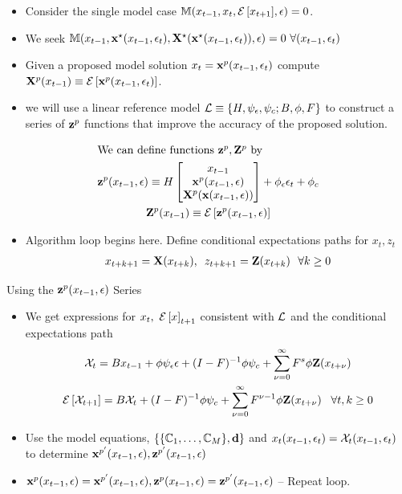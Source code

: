 \documentclass[12pt]{article}
\begin{document}
{
  \begin{itemize}
  \item Consider the single model case $  \mathbb{M}(x_{t-1},x_t,{\mathcal{E}\left [ x_{t+1} \right ]},\epsilon)=0$.  
\item We seek $\mathbb{M}(x_{t-1},\mathbf{x}^\star(x_{t-1},\epsilon_t),\mathbf{X}^\star(\mathbf{x}^\star(x_{t-1},\epsilon_t)),\epsilon)=0\,\,\forall (x_{t-1},\epsilon_t) $
\item Given a proposed model solution $x_t=\mathbf{x}^p(x_{t-1},\epsilon_t)$ compute $\mathbf{X}^p(x_{t-1})\equiv {\mathcal{E}\left [  \mathbf{x}^p(x_{t-1},\epsilon_t)\right ]}$. 
\item we will use a linear reference model ${\mathcal{L}}  \equiv {\{H,\psi_\epsilon,\psi_c;B,\phi,F\}}$ 
to construct a series of $\mathbf{z}^p$ functions that improve the accuracy of the proposed solution.
\end{itemize}
}



\begin{gather*}
 \intertext{We can define functions $\mathbf{z}^p,\mathbf{Z}^p$ by}
\mathbf{z}^p(x_{t-1},\epsilon)\equiv H
\begin{bmatrix}
x_{t-1}\\ \mathbf{x}^p(x_{t-1},\epsilon)\\ \mathbf{X}^p(\mathbf{x}(x_{t-1},\epsilon))
\end{bmatrix}+\phi_\epsilon \epsilon_t+\phi_c\\
\mathbf{Z}^p(x_{t-1})\equiv {\mathcal{E}\left [  \mathbf{z}^p(x_{t-1},\epsilon)\right ]}
\end{gather*}
 \begin{itemize}
\item  {\color{blue}Algorithm loop begins here.} Define conditional expectations paths for $x_t, z_t$ 
 \begin{gather*}
 x_{t+k+1}=\mathbf{X}(x_{t+k}),\,\,\,z_{t+k+1}=\mathbf{Z}(x_{t+k})\,\,\,\,  \forall k\ge 0      \end{gather*}
   \end{itemize}

{Using the $\mathbf{z}^p(x_{t-1},\epsilon)$ Series}
{\small
  \begin{itemize}
  \item We get expressions for $x_t,\,\, {\mathcal{E}\left [ x \right ]}_{t+1}$ consistent with ${\mathcal{L}}$ and the conditional expectations path
   \begin{gather*}
     \mathcal{X}_{t} =B x_{t-1}+ \phi \psi_\epsilon\epsilon + (I - F)^{-1} \phi \psi_c + \sum_{{\nu}=0}^\infty F^s \phi \mathbf{Z}(x_{t+\nu})\\
	{\mathcal{E}\left [  \mathcal{X}_{t+1} \right ]} =B \mathcal{X}_{t}  + (I - F)^{-1} \phi \psi_c+ \sum_{{\nu} =0}^\infty F^{{\nu}-1} \phi \mathbf{Z}(x_{t+\nu}) \,\,\,\,\,\forall t,k \ge  0
\end{gather*}
\item Use the model equations, $\{\{\mathbb{C}_{1},\ldots,\mathbb{C}_{M}\},\mathbf{d}\}$ and $x_t(x_{t-1},\epsilon_t)=\mathcal{X}_t(x_{t-1},\epsilon_t)$\\ to determine $\mathbf{x}^{p'}(x_{t-1},\epsilon), \mathbf{z}^{p'}(x_{t-1},\epsilon)$
\item $\mathbf{x}^p(x_{t-1},\epsilon)=\mathbf{x}^{p'}(x_{t-1},\epsilon), \mathbf{z}^p(x_{t-1},\epsilon)=\mathbf{z}^{p'}(x_{t-1},\epsilon)$ -- {\color{blue}Repeat loop.}
  \end{itemize}
}
\end{document}
